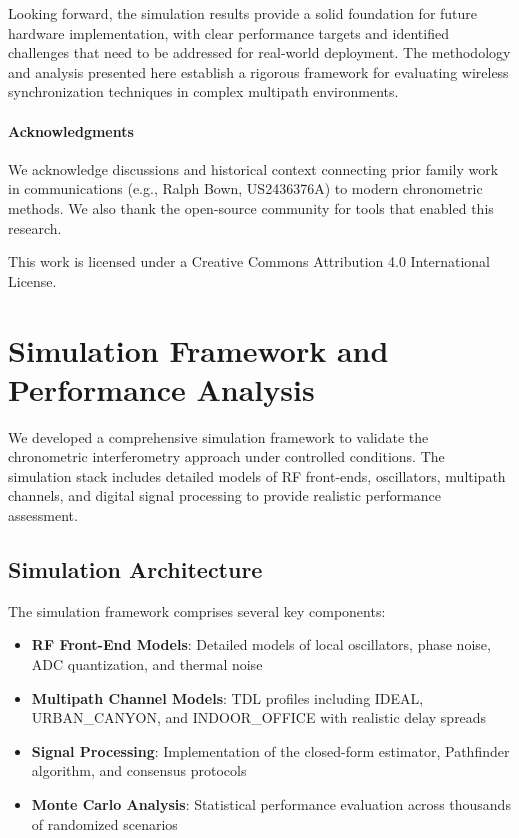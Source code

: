 \documentclass[10pt]{article}
\begin{document}
Looking forward, the simulation results provide a solid foundation for future hardware implementation, with clear performance targets and identified challenges that need to be addressed for real-world deployment. The methodology and analysis presented here establish a rigorous framework for evaluating wireless synchronization techniques in complex multipath environments.

\paragraph{Acknowledgments}
We acknowledge discussions and historical context connecting prior family work in communications (e.g., Ralph Bown, US2436376A) to modern chronometric methods. We also thank the open-source community for tools that enabled this research.

This work is licensed under a Creative Commons Attribution 4.0 International License.




\section{Simulation Framework and Performance Analysis}

We developed a comprehensive simulation framework to validate the chronometric interferometry approach under controlled conditions. The simulation stack includes detailed models of RF front-ends, oscillators, multipath channels, and digital signal processing to provide realistic performance assessment.

\subsection{Simulation Architecture}
The simulation framework comprises several key components:
\begin{itemize}[leftmargin=*]
  \item \textbf{RF Front-End Models}: Detailed models of local oscillators, phase noise, ADC quantization, and thermal noise
  \item \textbf{Multipath Channel Models}: TDL profiles including IDEAL, URBAN\_CANYON, and INDOOR\_OFFICE with realistic delay spreads
  \item \textbf{Signal Processing}: Implementation of the closed-form estimator, Pathfinder algorithm, and consensus protocols
  \item \textbf{Monte Carlo Analysis}: Statistical performance evaluation across thousands of randomized scenarios
\end{itemize}
\end{document}
